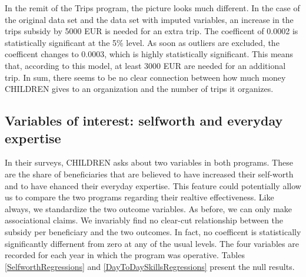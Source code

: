 \documentclass[12pt, a4paper, titlepage]{article}\usepackage[]{graphicx}\usepackage[]{color}
\begin{document}
In the remit of the Trips program, the picture looks much different. In the case of the original data set and the data set with imputed variables, an increase in the trips subsidy by 5000 EUR is needed for an extra trip. The coefficent of 0.0002 is statistically significant at the 5\% level. As soon as outliers are excluded, the coefficent changes to 0.0003, which is highly statistically significant. This means that, according to this model, at least 3000 EUR are needed for an additional trip.
In sum, there seems to be no clear connection between how much money CHILDREN gives to an organization and the number of trips it organizes. 


\begin{table}
\begin{center}
\caption{Regression Results: Number of trips}
\label{GrantsRegressionsTrips}
\end{center}
\end{table}


\subsection{Variables of interest: selfworth and everyday expertise} 

In their surveys, CHILDREN asks about two variables in both programs. These are the share of beneficiaries that are believed to have increased their self-worth and to have ehanced their everyday expertise. This feature could potentially allow us to compare the two programs regarding their realtive effectiveness. Like always, we standardize the two outcome variables. As before, we can only make associational claims. We invariably find no clear-cut relationship between the subsidy per beneficiary and the two outcomes. In fact, no coefficent is statistically significantly differnent from zero at any of the usual levels. 
The four variables are recorded for each year in which the program was operative.
Tables \ref{SelfworthRegressions} and \ref{DayToDaySkillsRegressions} present the null results. 
\end{document}
